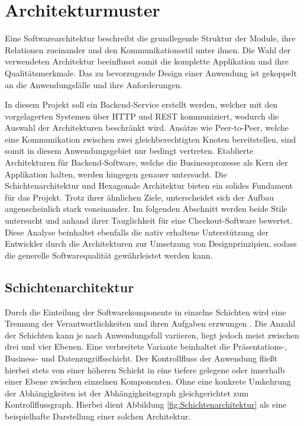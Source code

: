 \section{Architekturmuster}

Eine Softwarearchitektur beschreibt die grundlegende Struktur der Module, ihre Relationen zueinander und den Kommunikationsstil unter ihnen. Die Wahl der verwendeten Architektur beeinflusst somit die komplette Applikation und ihre Qualitätsmerkmale. Das zu bevorzugende Design einer Anwendung ist gekoppelt an die Anwendungsfälle und ihre Anforderungen. 

In diesem Projekt soll ein Backend-Service erstellt werden, welcher mit den vorgelagerten Systemen über \acrshort{HTTP} und \acrshort{REST} kommuniziert, wodurch die Auswahl der Architekturen beschränkt wird. Ansätze wie Peer-to-Peer, welche eine Kommunikation zwischen zwei gleichberechtigten Knoten bereitstellen, sind somit in diesem Anwendungsgebiet nur bedingt vertreten. Etablierte Architekturen für Backend-Software, welche die Businessprozesse als Kern der Applikation halten, werden hingegen genauer untersucht. Die Schichtenarchitektur und Hexagonale Architektur bieten ein solides Fundament für das Projekt. Trotz ihrer ähnlichen Ziele, unterscheidet sich der Aufbau augenscheinlich stark voneinander. Im folgenden Abschnitt werden beide Stile untersucht und anhand ihrer Tauglichkeit für eine Checkout-Software bewertet. Diese Analyse beinhaltet ebenfalls die nativ erhaltene Unterstützung der Entwickler durch die Architekturen zur Umsetzung von Designprinzipien, sodass die generelle Softwarequalität gewährleistet werden kann.

\subsection{Schichtenarchitektur}

Durch die Einteilung der Softwarekomponente in einzelne Schichten wird eine Trennung der Verantwortlichkeiten und ihren Aufgaben erzwungen \cite[S. 185]{Buschmann.2011}. Die Anzahl der Schichten kann je nach Anwendungsfall variieren, liegt jedoch meist zwischen drei und vier Ebenen. Eine verbreitete Variante beinhaltet die Präsentations-, Business- und Datenzugriffsschicht. Der Kontrollfluss der Anwendung fließt hierbei stets von einer höheren Schicht in eine tiefere gelegene oder innerhalb einer Ebene zwischen einzelnen Komponenten. Ohne eine konkrete Umkehrung der Abhängigkeiten ist der Abhängigkeitsgraph gleichgerichtet zum Kontrollflussgraph. \cite[S. 17]{Fowler.2011} Hierbei dient Abbildung \ref{fig:Schichtenarchitektur} als eine beispielhafte Darstellung einer solchen Architektur. 

